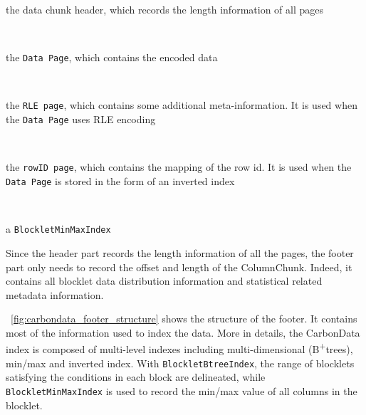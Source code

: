 \documentclass[10pt, a4paper]{report}
\begin{document}
\begin{itemize}
	\begin{minipage}{0.92\textwidth}
		\item the data chunk header, which records the length information of all pages \\
	\end{minipage} \\
	\begin{minipage}{0.92\textwidth}
		\item the \texttt{Data Page}, which contains the encoded data \\
	\end{minipage} \\
	\begin{minipage}{0.92\textwidth}
		\item the \texttt{RLE page}, which contains some additional meta-information. It is used when the \texttt{Data Page} uses RLE encoding \\
	\end{minipage} \\
	\begin{minipage}{0.92\textwidth}
		\item the \texttt{rowID page}, which contains the mapping of the row id. It is used when the \texttt{Data Page} is stored in the form of an inverted index \\
	\end{minipage} \\
	\begin{minipage}{0.92\textwidth}
		\item a \texttt{BlockletMinMaxIndex} \\
	\end{minipage}
\end{itemize}

Since the header part records the length information of all the pages, the footer part only needs to record the offset and length of the ColumnChunk. Indeed, it contains all blocklet data distribution information and statistical related metadata information.

\figurename~\ref{fig:carbondata_footer_structure} shows the structure of the footer. It contains most of the information used to index the data. More in details, the CarbonData index is composed of multi-level indexes including multi-dimensional (B\textsuperscript{+}trees), min/max and inverted index. With \texttt{BlockletBtreeIndex}, the range of blocklets satisfying the conditions in each block are delineated, while \texttt{BlockletMinMaxIndex} is used to record the min/max value of all columns in the blocklet.
\end{document}
